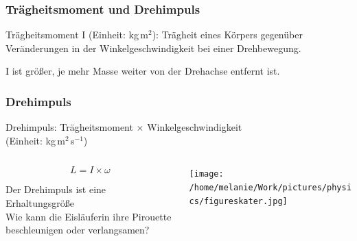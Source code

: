 \documentclass{beamer}
\begin{document}

\begin{frame}
\frametitle{Trägheitsmoment und Drehimpuls}


Trägheitsmoment I (Einheit:  kg\(\,\)m$^2$): Trägheit eines Körpers gegenüber Veränderungen in der Winkelgeschwindigkeit bei einer Drehbewegung. 

I ist größer, je mehr Masse weiter von der Drehachse entfernt ist. 




\end{frame}


\begin{frame}
\frametitle{Drehimpuls}

Drehimpuls: Trägheitsmoment \(\times\) Winkelgeschwindigkeit \\ (Einheit: kg\(\,\)m$^2\,$s$^{-1}$)



\begin{columns}[c]

\begin{column}{5cm}



\[
L = I\times \omega
\]


Der Drehimpuls ist eine Erhaltungsgröße \\[0.2 cm]


Wie kann die Eisläuferin ihre Pirouette beschleunigen oder verlangsamen?


\end{column}

\begin{column}{5cm}


\begin{center}
\texttt{[image: /home/melanie/Work/pictures/physics/figureskater.jpg]}
\end{center}

\end{column}


\end{columns}


\end{frame}


\end{document}
